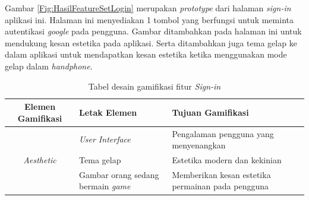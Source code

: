 Gambar \ref*{Fig:HasilFeatureSetLogin} merupakan \textit{prototype} dari halaman \textit{sign-in} aplikasi ini. 
Halaman ini menyediakan 1 tombol yang berfungsi untuk meminta autentikasi \textit{google} pada pengguna.
Gambar ditambahkan pada halaman ini untuk mendukung kesan estetika pada aplikasi. 
Serta ditambahkan juga tema gelap ke dalam aplikasi untuk mendapatkan kesan estetika ketika menggunakan mode gelap dalam \textit{handphone}.
\begin{table}[H]
	\caption{Tabel desain gamifikasi fitur \textit{Sign-in}}
	\begin{tabular}{|c|m{}|m{}|}
		\hline
		Elemen Gamifikasi& Letak Elemen & Tujuan Gamifikasi\\
		\hline
		\multirow{3}{2.5cm}{\textit{Aesthetic}}&\textit{User Interface}&Pengalaman pengguna yang menyenangkan\\
		\cline{2-3}
		& Tema gelap & Estetika modern dan kekinian \\
		\cline{2-3}
		& Gambar orang sedang bermain \textit{game} & Memberikan kesan estetika permainan pada pengguna \\
		\hline
	\end{tabular}
\end{table}
